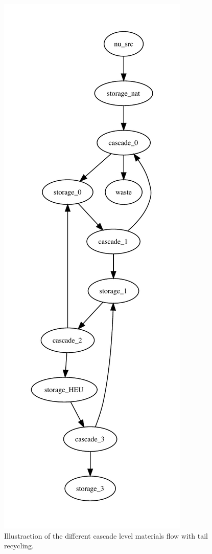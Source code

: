 \documentclass{anstrans}
\begin{document}
\begin{figure}[ht] %
  \centering
  \includegraphics[scale=0.7]{flow_case_2_recy.pdf}
  \caption{Illustraction of the different cascade level materials flow with tail
  recycling.}
  \label{fig:flow}
\end{figure}
\end{document}
